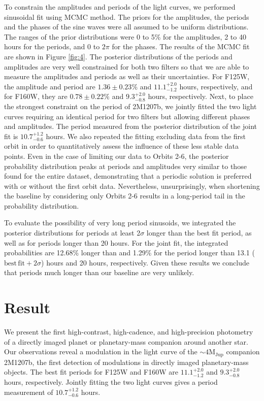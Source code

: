 \documentclass[apj]{emulateapj}
\newcommand{\revise}[1]{\textbf{{\color{cyan}{#1}}}}
\renewcommand{\revise}{}
\newcommand{\reviseTwo}[1]{\textbf{{\color{cyan}{#1}}}}
\renewcommand{\reviseTwo}{}
\newcommand{\period}{$10.7^{+1.2}_{-0.6}$}
\newcommand{\Jperiod}{$11.1^{+2.0}_{{-1.2}}$}
\newcommand{\Jamp}{$1.36\pm0.23 \%$}
\newcommand{\Hperiod}{$9.3^{+2.0}_{{-0.8}}$}
\newcommand{\Hamp}{$0.78\pm0.22 \%$}
\begin{document}
\revise{To constrain the amplitudes and periods of the light curves,
  we performed sinusoidal fit using MCMC method.  The priors for the
  amplitudes, the periods and the phases of the sine waves were all
  assumed to be uniform distributions. The ranges of the prior
  distributions were 0 to 5\% for the amplitudes, 2 to 40 hours for
  the periods, and 0 to $2\pi$
  for the phases. The results of the MCMC fit are shown in Figure
  \ref{fig:4}. The posterior distributions of the periods and
  amplitudes are very well constrained for both two filters so that we
  are able to measure the amplitudes and periods as well as their
  uncertainties. For F125W, the amplitude and period are \Jamp{} and
  \Jperiod{} \reviseTwo{hours}, respectively, and for F160W, they are
  \Hamp{} and \Hperiod{} \reviseTwo{hours},
  respectively. \reviseTwo{Next, to place the strongest constraint on
    the period of 2M1207b, we jointly fitted the two light curves
    requiring an identical period for two filters but allowing
    different phases and amplitudes. The period measured from the
    posterior distribution of the joint fit is \period{} hours.} We
  also repeated the fitting excluding data from the first orbit in
  order to quantitatively assess the influence of these less stable
  data points. Even in the case of limiting our data to Orbits 2-6,
  the posterior probability distribution peaks at periods and
  amplitudes very similar to those found for the entire dataset,
  demonstrating that a periodic solution is preferred with or without
  the first orbit data. Nevertheless, unsurprisingly, when shortening
  the baseline by considering only Orbits 2-6 results in a long-period
  tail in the probability distribution.}

\reviseTwo{To evaluate the possibility of very long period sinusoids,
  we integrated the posterior distributions for periods at least
  2$\sigma$
  longer than the best fit period, as well as for periods longer than
  20 hours. For the joint fit, the integrated probabilities are
  12.68\% longer than and 1.29\% for the period longer than 13.1
  ($\mathrm{best\, fit + 2}\sigma$)
  hours and 20 hours, respectively. Given these results we conclude
  that periods much longer than our baseline are very unlikely.}


\section{Result}
\label{Results}

We present the first high-contrast, high-cadence, and high-precision
photometry of a directly imaged planet or planetary-mass
companion around another star. Our observations reveal a modulation in the light curve of
the $\sim 4 \mathrm{M_{{Jup}}}$ companion 2M1207b, the first detection
of modulations in directly imaged planetary-mass objects. The best
fit periods for F125W and F160W are $11.1_{-1.2}^{+2.0}$  and $9.3_{-0.8}^{+2.0}$ hours,
respectively. Jointly fitting the two light curves gives a period
measurement of \period{} hours.
\end{document}
